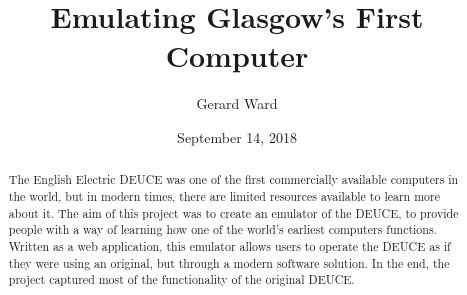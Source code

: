\documentclass{l4proj}
\begin{document}
\title{Emulating Glasgow's First Computer}
\author{Gerard Ward}
\date{September 14, 2018}

\maketitle

\begin{abstract}
    The English Electric DEUCE was one of the first commercially available computers in the world,
	but in modern times, there are limited resources available to learn more about it. The aim of
	this project was to create an emulator of the DEUCE, to provide people with a way of learning
	how one of the world's earliest computers functions. Written as a web application, this emulator
	allows users to operate the DEUCE as if they were using an original, but through a modern software
	solution. In the end, the project captured most of the functionality of the original DEUCE.
\end{abstract}


%
%
\def\consentname {Gerard Dominic Ward} %
\def\consentdate {20 March 2018} %
%
\educationalconsent


\tableofcontents
\end{document}
